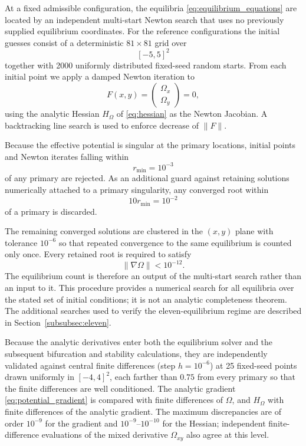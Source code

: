 At a fixed admissible configuration, the equilibria
\eqref{eq:equilibrium_equations} are located by an independent multi-start
Newton search that uses no previously supplied equilibrium coordinates.
For the reference configurations the initial guesses consist of a
deterministic $81\times81$ grid over
\[
[-5,5]^2
\]
together with 2000 uniformly distributed fixed-seed random starts. From
each initial point we apply a damped Newton iteration to
\[
F(x,y)=
\begin{pmatrix}
\Omega_x\\
\Omega_y
\end{pmatrix}
=0,
\]
using the analytic Hessian $H_\Omega$ of
\eqref{eq:hessian} as the Newton Jacobian. A backtracking line search is
used to enforce decrease of $\|F\|$.

Because the effective potential is singular at the primary locations,
initial points and Newton iterates falling within
\[
r_{\min}=10^{-3}
\]
of any primary are rejected. As an additional guard against retaining
solutions numerically attached to a primary singularity, any converged root
within
\[
10r_{\min}=10^{-2}
\]
of a primary is discarded.

The remaining converged solutions are clustered in the $(x,y)$ plane with
tolerance $10^{-6}$ so that repeated convergence to the same equilibrium is
counted only once. Every retained root is required to satisfy
\begin{equation}
\|\nabla\Omega\|<10^{-12}.
\label{eq:equilibrium_residual}
\end{equation}
The equilibrium count is therefore an output of the multi-start search
rather than an input to it. This procedure provides a numerical search for
all equilibria over the stated set of initial conditions; it is not an
analytic completeness theorem. The additional searches used to verify the
eleven-equilibrium regime are described in Section~\ref{subsubsec:eleven}.

Because the analytic derivatives enter both the equilibrium solver and the
subsequent bifurcation and stability calculations, they are independently
validated against central finite differences (step $h=10^{-6}$) at 25
fixed-seed points drawn uniformly in $[-4,4]^2$, each farther than $0.75$
from every primary so that the finite differences are well conditioned. The
analytic gradient
\eqref{eq:potential_gradient} is compared with finite differences of
$\Omega$, and $H_\Omega$ with finite differences of the analytic gradient.
The maximum discrepancies are of order $10^{-9}$ for the gradient and
$10^{-9}$--$10^{-10}$ for the Hessian; independent finite-difference
evaluations of the mixed derivative $\Omega_{xy}$ also agree at this level.

